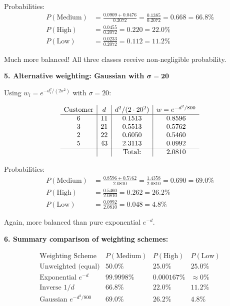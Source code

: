 \documentclass[12pt]{article}
\begin{document}
\begin{computation}
Probabilities:
\begin{align*}
P(\text{Medium}) &= \frac{0.0909 + 0.0476}{0.2072} = \frac{0.1385}{0.2072} = 0.668 = 66.8\% \\
P(\text{High}) &= \frac{0.0455}{0.2072} = 0.220 = 22.0\% \\
P(\text{Low}) &= \frac{0.0233}{0.2072} = 0.112 = 11.2\%
\end{align*}

Much more balanced! All three classes receive non-negligible probability.

\textbf{5. Alternative weighting: Gaussian with $\boldsymbol{\sigma = 20}$}

Using \(w_i = e^{-d_i^2/(2\sigma^2)}\) with \(\sigma = 20\):

\[
\begin{array}{c|c|c|c}
\text{Customer} & d & d^2/(2 \cdot 20^2) & w = e^{-d^2/800} \\
\hline
6 & 11 & 0.1513 & 0.8596 \\
3 & 21 & 0.5513 & 0.5762 \\
2 & 22 & 0.6050 & 0.5460 \\
5 & 43 & 2.3113 & 0.0992 \\
\hline
& & \text{Total:} & 2.0810 \\
\end{array}
\]

Probabilities:
\begin{align*}
P(\text{Medium}) &= \frac{0.8596 + 0.5762}{2.0810} = \frac{1.4358}{2.0810} = 0.690 = 69.0\% \\
P(\text{High}) &= \frac{0.5460}{2.0810} = 0.262 = 26.2\% \\
P(\text{Low}) &= \frac{0.0992}{2.0810} = 0.048 = 4.8\%
\end{align*}

Again, more balanced than pure exponential \(e^{-d}\).

\textbf{6. Summary comparison of weighting schemes:}

\[
\begin{array}{l|c|c|c}
\text{Weighting Scheme} & P(\text{Medium}) & P(\text{High}) & P(\text{Low}) \\
\hline
\text{Unweighted (equal)} & 50.0\% & 25.0\% & 25.0\% \\
\text{Exponential } e^{-d} & 99.9998\% & 0.000167\% & \approx 0\% \\
\text{Inverse } 1/d & 66.8\% & 22.0\% & 11.2\% \\
\text{Gaussian } e^{-d^2/800} & 69.0\% & 26.2\% & 4.8\% \\
\end{array}
\]


\end{computation}
\end{document}
